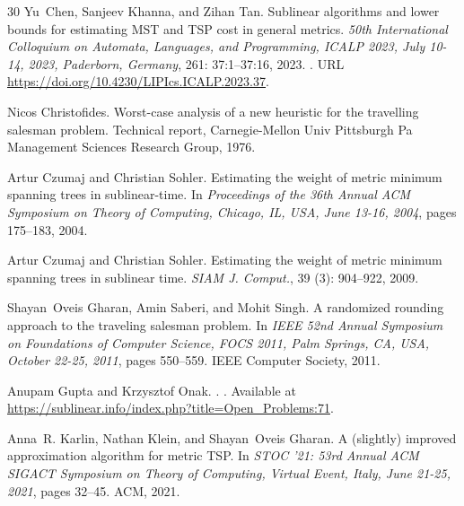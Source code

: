 \documentclass[letterpaper,11pt]{article}
\begin{document}
\begin{thebibliography}{30}
Yu~Chen, Sanjeev Khanna, and Zihan Tan.
\newblock Sublinear algorithms and lower bounds for estimating {MST} and {TSP}
  cost in general metrics.
\newblock \emph{50th International Colloquium on Automata, Languages, and
  Programming, {ICALP} 2023, July 10-14, 2023, Paderborn, Germany},
  261: 37:1--37:16, 2023.
\newblock {}.
\newblock URL \url{https://doi.org/10.4230/LIPIcs.ICALP.2023.37}.

Nicos Christofides.
\newblock Worst-case analysis of a new heuristic for the travelling salesman
  problem.
\newblock Technical report, Carnegie-Mellon Univ Pittsburgh Pa Management
  Sciences Research Group, 1976.

Artur Czumaj and Christian Sohler.
\newblock Estimating the weight of metric minimum spanning trees in
  sublinear-time.
\newblock In \emph{Proceedings of the 36th Annual {ACM} Symposium on Theory of
  Computing, Chicago, IL, USA, June 13-16, 2004}, pages 175--183, 2004.

Artur Czumaj and Christian Sohler.
\newblock Estimating the weight of metric minimum spanning trees in sublinear
  time.
\newblock \emph{{SIAM} J. Comput.}, 39 (3): 904--922, 2009.

Shayan~Oveis Gharan, Amin Saberi, and Mohit Singh.
\newblock A randomized rounding approach to the traveling salesman problem.
\newblock In \emph{{IEEE} 52nd Annual Symposium on Foundations of Computer
  Science, {FOCS} 2011, Palm Springs, CA, USA, October 22-25, 2011}, pages
  550--559. {IEEE} Computer Society, 2011.

Anupam Gupta and Krzysztof Onak.
.
.
\newblock Available at
  \url{https://sublinear.info/index.php?title=Open_Problems:71}.

Anna~R. Karlin, Nathan Klein, and Shayan~Oveis Gharan.
\newblock A (slightly) improved approximation algorithm for metric {TSP}.
\newblock In \emph{{STOC} '21: 53rd Annual {ACM} {SIGACT} Symposium on Theory
  of Computing, Virtual Event, Italy, June 21-25, 2021}, pages 32--45. {ACM},
  2021.


\end{thebibliography}
\end{document}
